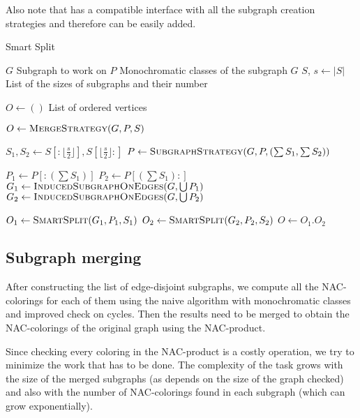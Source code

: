 Also note that  has a compatible interface with
all the subgraph creation strategies and therefore can be easily added.

\begin{algorithm}
	\caption{Smart Split}%
	\label{alg:smart_split}
	\begin{algorithmic}[1]
		\Require{} $G$
		\Comment{} Subgraph to work on
		\Require{} $P$
		\Comment{} Monochromatic classes of the subgraph $G$
		\Require{} $S$, $s \gets |S|$
		\Comment{} List of the sizes of subgraphs and their number

		\Ensure{} $O \gets ()$
		\Comment{} List of ordered vertices

		\State{} $O \gets \Call{MergeStrategy}{G, P, S}$
		\State{}
		\Return{}
		\EndIf{}

		\State{} $S_1, S_2 \gets S[:\lfloor\frac{s}{2}\rfloor], S[\lfloor\frac{s}{2}\rfloor:]$
		\State{} $P \gets \Call{SubgraphStrategy}{G, P, (\sum S_{1}, \sum S_{2})}$

		\State{} $P_1 \gets P[:(\sum S_1)]$
		\State{} $P_2 \gets P[(\sum S_1):]$
		\State{} $G_1 \gets \Call{InducedSubgraphOnEdges}{G, \bigcup P_1}$
		\State{} $G_2 \gets \Call{InducedSubgraphOnEdges}{G, \bigcup P_2}$

		\State{} $O_1 \gets \Call{SmartSplit}{G_1, P_1, S_1}$
		\State{} $O_2 \gets \Call{SmartSplit}{G_2, P_2, S_2}$
		\State{} $O \gets O_{1}.O_{2}$
	\end{algorithmic}
\end{algorithm}


\subsection{Subgraph merging}%
\label{sec:merging}

After constructing the list of edge-disjoint subgraphs,
we compute all the NAC-colorings for each of them using
the naive algorithm with monochromatic classes
and improved check on cycles.
Then the results need to be merged to obtain the NAC-colorings of the original graph
using the NAC-product.

Since checking every coloring in the NAC-product is a costly operation,
we try to minimize the work that has to be done.
The complexity of the task grows with the size of
the merged subgraphs (as \IsNACColoring{} depends on the size of the graph checked)
and also with the number of NAC-colorings found in each subgraph
(which can grow exponentially).

